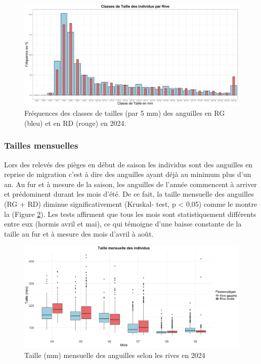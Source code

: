 \documentclass[11pt,titlepage,twoside]{article}\usepackage[]{graphicx}\usepackage[table]{xcolor}
\begin{document}
\begin{figure}[htpb]
\centering
\includegraphics[width=\textwidth]{classe_taille_oral.png}
\caption{Fréquences des classes de tailles (par 5 mm) des anguilles en RG (bleu) et en RD (rouge) en 2024.}
\label{classe_taille_oral}
\end{figure}

\subsubsection{Tailles mensuelles}

Lors des relevés des pièges en début de saison les individus sont des anguilles en reprise de migration c’est à dire des anguilles ayant déjà au minimum plus d’un an. Au fur et à mesure de la saison, les anguilles de l’année commencent à arriver et prédominent durant les mois d’été. De ce fait, la taille mensuelle des anguilles (RG + RD) diminue significativement (Kruskal- test, p < 0,05) comme le montre la (Figure \ref{taille_mois_oral}). Les tests affirment que tous les mois sont statistiquement différents entre eux (hormis avril et mai), ce qui témoigne d’une baisse constante de la taille au fur et à mesure des mois d’avril à août.


\begin{figure}[htpb]
\centering
\includegraphics[width=\textwidth]{taille_mois_oral.png}
\caption{Taille (mm) mensuelle des anguilles selon les rives en 2024}
\label{taille_mois_oral}
\end{figure} 
\end{document}
